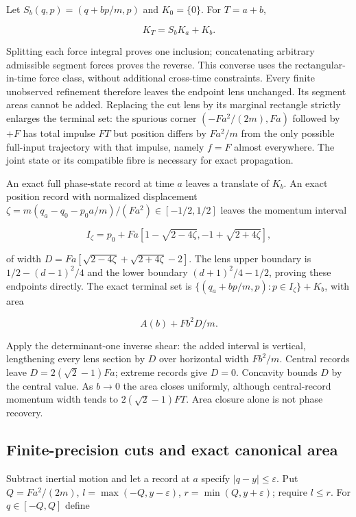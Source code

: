 \documentclass[11pt,a4paper]{article}
\begin{document}
Let \(S_b(q,p)=(q+bp/m,p)\) and \(K_0=\{0\}\). For \(T=a+b\),

\[K_T=S_bK_a+K_b.\]

Splitting each force integral proves one inclusion; concatenating
arbitrary admissible segment forces proves the reverse. This converse
uses the rectangular-in-time force class, without additional cross-time
constraints. Every finite unobserved refinement therefore leaves the
endpoint lens unchanged. Its segment areas cannot be added. Replacing
the cut lens by its marginal rectangle strictly enlarges the terminal
set: the spurious corner \((-Fa^2/(2m),Fa)\) followed by \(+F\) has
total impulse \(FT\) but position differs by \(Fa^2/m\) from the only
possible full-input trajectory with that impulse, namely \(f=F\) almost
everywhere. The joint state or its compatible fibre is necessary for
exact propagation.

An exact full phase-state record at time \(a\) leaves a translate of
\(K_b\). An exact position record with normalized displacement
\(\zeta=m(q_a-q_0-p_0a/m)/(Fa^2)\in[-1/2,1/2]\) leaves the momentum
interval

\[I_\zeta=p_0+Fa[1-\sqrt{2-4\zeta},-1+\sqrt{2+4\zeta}],\]

of width \(D=Fa[\sqrt{2-4\zeta}+\sqrt{2+4\zeta}-2]\). The lens upper
boundary is \(1/2-(d-1)^2/4\) and the lower boundary \((d+1)^2/4-1/2\),
proving these endpoints directly. The exact terminal set is
\(\{(q_a+bp/m,p):p\in I_\zeta\}+K_b\), with area

\[A(b)+Fb^2D/m.\]

Apply the determinant-one inverse shear: the added interval is vertical,
lengthening every lens section by \(D\) over horizontal width
\(Fb^2/m\). Central records leave \(D=2(\sqrt2-1)Fa\); extreme records
give \(D=0\). Concavity bounds \(D\) by the central value. As \(b\to0\)
the area closes uniformly, although central-record momentum width tends
to \(2(\sqrt2-1)FT\). Area closure alone is not phase recovery.

\hypertarget{finite-precision-cuts-and-exact-canonical-area}{%
\subsection{Finite-precision cuts and exact canonical
area}\label{finite-precision-cuts-and-exact-canonical-area}}

Subtract inertial motion and let a record at \(a\) specify
\(|q-y|\le\varepsilon\). Put \(Q=Fa^2/(2m)\),
\(l=\max(-Q,y-\varepsilon)\), \(r=\min(Q,y+\varepsilon)\); require
\(l\le r\). For \(q\in[-Q,Q]\) define
\end{document}
